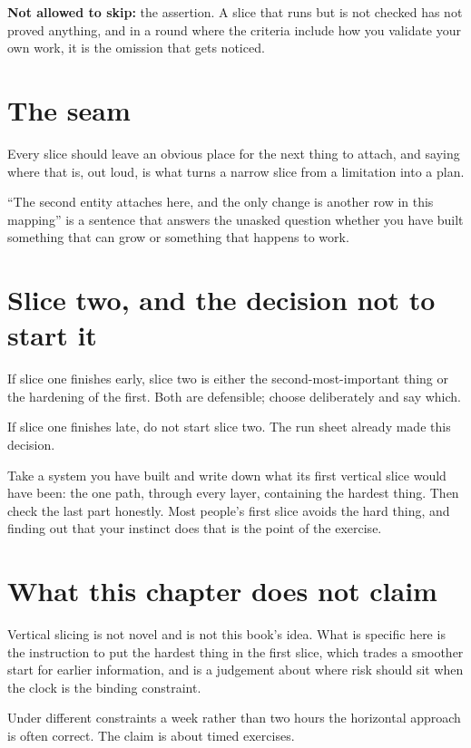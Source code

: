 \textbf{Not allowed to skip:} the assertion. A slice that runs but is not
checked has not proved anything, and in a round where the criteria include how
you validate your own work, it is the omission that gets noticed.


\section{The seam}

Every slice should leave an obvious place for the next thing to attach, and
saying where that is, out loud, is what turns a narrow slice from a limitation
into a plan.

``The second entity attaches here, and the only change is another row in this
mapping'' is a sentence that answers the unasked question \dash{} whether you
have built something that can grow or something that happens to work.

\section{Slice two, and the decision not to start it}

If slice one finishes early, slice two is either the second-most-important
thing or the hardening of the first. Both are defensible; choose deliberately
and say which.

If slice one finishes late, do not start slice two. The run sheet already made
this decision. 

\begin{drill}
Take a system you have built and write down what its first vertical slice
would have been: the one path, through every layer, containing the hardest
thing. Then check the last part honestly. Most people's first slice avoids the
hard thing, and finding out that your instinct does that is the point of the
exercise.
\end{drill}

\section*{What this chapter does not claim}

Vertical slicing is not novel and is not this book's idea. What is specific
here is the instruction to put the hardest thing in the first slice, which
trades a smoother start for earlier information, and is a judgement about where
risk should sit when the clock is the binding constraint.

Under different constraints \dash{} a week rather than two hours \dash{} the
horizontal approach is often correct. The claim is about timed exercises.
